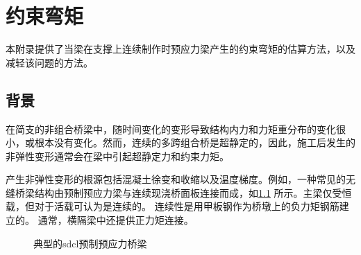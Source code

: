 \chapter{约束弯矩}
本附录提供了当梁在支撑上连续制作时预应力梁产生的约束弯矩的估算方法，以及减轻该问题的方法。
\section{背景}
在简支的非组合桥梁中，随时间变化的变形导致结构内力和力矩重分布的变化很小，或根本没有变化。然而，连续的多跨组合桥是超静定的，因此，施工后发生的非弹性变形通常会在梁中引起超静定力和约束力矩。

产生非弹性变形的根源包括混凝土徐变和收缩以及温度梯度。例如，一种常见的无缝桥梁结构由预制预应力梁与连续现浇桥面板连接而成，如\cref{fig:sdlc-beam} 所示。主梁仅受恒载，但对于活载可认为是连续的。 连续性是用甲板钢作为桥墩上的负力矩钢筋建立的。 通常，横隔梁中还提供正力矩连接。

\begin{figure}
  \caption{典型的\gls*{sdcl}预制预应力桥梁}
  \label{fig:sdlc-beam}
\end{figure}

